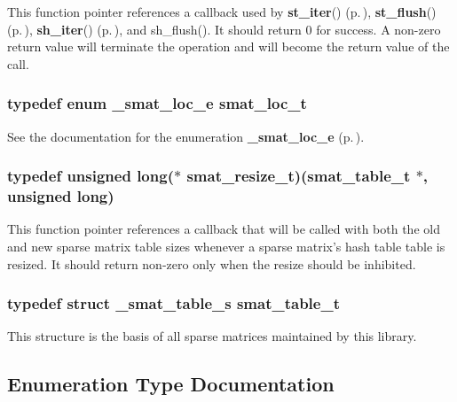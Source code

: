  This function pointer references a callback used by {\bf st\_\-iter}() {\rm (p.\,\pageref{group__dbprim__smat_a13})}, {\bf st\_\-flush}() {\rm (p.\,\pageref{group__dbprim__smat_a14})}, {\bf sh\_\-iter}() {\rm (p.\,\pageref{group__dbprim__smat_a20})}, and sh\_\-flush(). It should return 0 for success. A non-zero return value will terminate the operation and will become the return value of the call. 
\subsubsection{\setlength{\rightskip}{0pt plus 5cm}typedef enum {\bf \_\-smat\_\-loc\_\-e} smat\_\-loc\_\-t}\label{group__dbprim__smat_a6}




 See the documentation for the enumeration {\bf \_\-smat\_\-loc\_\-e} {\rm (p.\,\pageref{group__dbprim__smat_a48})}. 
\subsubsection{\setlength{\rightskip}{0pt plus 5cm}typedef unsigned long($\ast$ smat\_\-resize\_\-t)({\bf smat\_\-table\_\-t} $\ast$, unsigned long)}\label{group__dbprim__smat_a3}




 This function pointer references a callback that will be called with both the old and new sparse matrix table sizes whenever a sparse matrix's hash table table is resized. It should return non-zero only when the resize should be inhibited. 
\subsubsection{\setlength{\rightskip}{0pt plus 5cm}typedef struct \_\-smat\_\-table\_\-s smat\_\-table\_\-t}\label{group__dbprim__smat_a0}




 This structure is the basis of all sparse matrices maintained by this library. 

\subsection{Enumeration Type Documentation}
